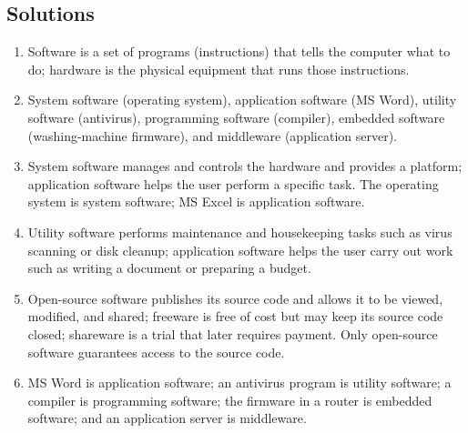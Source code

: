 \documentclass[11pt]{article}
\begin{document}
\subsection*{Solutions}
\begingroup\small
\begin{enumerate}[label=\arabic*.]
  \item Software is a set of programs (instructions) that tells the computer
    what to do; hardware is the physical equipment that runs those
    instructions.
  \item System software (operating system), application software (MS Word),
    utility software (antivirus), programming software (compiler), embedded
    software (washing-machine firmware), and middleware (application server).
  \item System software manages and controls the hardware and provides a
    platform; application software helps the user perform a specific task.
    The operating system is system software; MS Excel is application
    software.
  \item Utility software performs maintenance and housekeeping tasks such as
    virus scanning or disk cleanup; application software helps the user carry
    out work such as writing a document or preparing a budget.
  \item Open-source software publishes its source code and allows it to be
    viewed, modified, and shared; freeware is free of cost but may keep its
    source code closed; shareware is a trial that later requires payment.
    Only open-source software guarantees access to the source code.
  \item MS Word is application software; an antivirus program is utility
    software; a compiler is programming software; the firmware in a router is
    embedded software; and an application server is middleware.
\end{enumerate}
\endgroup
\end{document}
